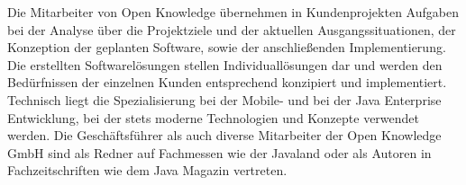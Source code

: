Die Mitarbeiter von Open Knowledge übernehmen in Kundenprojekten Aufgaben bei der Analyse über die Projektziele und der aktuellen Ausgangssituationen, der Konzeption der geplanten Software, sowie der anschließenden Implementierung. Die erstellten Softwarelösungen stellen Individuallösungen dar und werden den Bedürfnissen der einzelnen Kunden entsprechend konzipiert und implementiert. Technisch liegt die Spezialisierung bei der Mobile- und bei der Java Enterprise Entwicklung, bei der stets moderne Technologien und Konzepte verwendet werden. Die Geschäftsführer als auch diverse Mitarbeiter der Open Knowledge GmbH sind als Redner auf Fachmessen wie der Javaland oder als Autoren in Fachzeitschriften wie dem Java Magazin vertreten. %

%

\pagebreak
